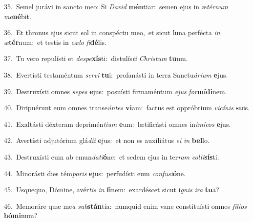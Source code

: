 {\numbfont\textcolor{\numbcolor}{35.}}~Semel jurávi in sancto meo: Si \textit{Da}\-\textit{vid} \textbf{mén}\-tiar:~\star semen ejus in æ\-\textit{tér}\-\textit{num} \textit{ma}\-\textbf{né}bit.\par
{\numbfont\textcolor{\numbcolor}{36.}}~Et thronus ejus sicut sol in conspéctu meo,~\dagger et sicut luna perfécta \textit{in} \textit{æ}\-\textbf{tér}num:~\star et testis in \textit{cæ}\-\textit{lo} \textit{fi}\-\textbf{dé}lis.\par
{\numbfont\textcolor{\numbcolor}{37.}}~Tu vero repulísti et \textit{de}\-\textit{spe}\textbf{xís}ti:~\star distulís\textit{ti} \textit{Chris}\-\textit{tum} \textbf{tu}\-um.\par
{\numbfont\textcolor{\numbcolor}{38.}}~Evertísti testaméntum \textit{ser}\-\textit{vi} \textbf{tu}\-i:~\star profanásti in terra Sanctu\-\textit{á}\-\textit{ri}\textit{um} \textbf{e}\-jus.\par
{\numbfont\textcolor{\numbcolor}{39.}}~Destruxísti omnes \textit{se}\-\textit{pes} \textbf{e}\-jus:~\star posuísti firmaméntum \textit{e}\-\textit{jus} \textit{for}\-\textbf{mí}\textbf{di}nem.\par
{\numbfont\textcolor{\numbcolor}{40.}}~Diripuérunt eum omnes transe\-\textit{ún}\-\textit{tes} \textbf{vi}\-am:~\star factus est oppróbrium \textit{vi}\-\textit{cí}\textit{nis} \textbf{su}\-is.\par
{\numbfont\textcolor{\numbcolor}{41.}}~Exaltásti déxteram deprimén\-\textit{ti}\-\textit{um} \textbf{e}\-um:~\star lætificásti omnes in\-\textit{i}\-\textit{mí}\textit{cos} \textbf{e}\-jus.\par
{\numbfont\textcolor{\numbcolor}{42.}}~Avertísti adjutórium glá\-\textit{di}\-\textit{i} \textbf{e}\-jus:~\star et non es auxiliátus \textit{e}\-\textit{i} \textit{in} \textbf{bel}\-lo.\par
{\numbfont\textcolor{\numbcolor}{43.}}~Destruxísti eum ab emun\-\textit{da}\-\textit{ti}\textbf{ó}ne:~\star et sedem ejus in ter\textit{ram} \textit{col}\-\textit{li}\textbf{sís}ti.\par
{\numbfont\textcolor{\numbcolor}{44.}}~Minorásti dies tém\-\textit{po}\-\textit{ris} \textbf{e}\-jus:~\star perfudísti eum \textit{con}\-\textit{fu}\textit{si}\textbf{ó}ne.\par
{\numbfont\textcolor{\numbcolor}{45.}}~Usquequo, Dómine, avér\textit{tis} \textit{in} \textbf{fi}\-nem:~\star exardéscet sicut i\textit{gnis} \textit{i}\-\textit{ra} \textbf{tu}\-a?\par
{\numbfont\textcolor{\numbcolor}{46.}}~Memoráre quæ me\textit{a} \textit{sub}\-\textbf{stán}tia:~\star numquid enim vane constituísti omnes \textit{fí}\-\textit{li}\textit{os} \textbf{hó}\-\textbf{mi}num?\par
